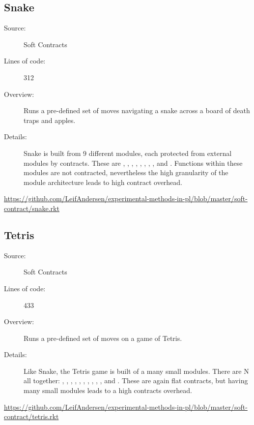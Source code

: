 \subsection*{Snake~\hrulefill}
\begin{description}
\item[Source:] Soft Contracts
\item[Lines of code:] 312
\item[Overview:]
  Runs a pre-defined set of moves navigating a snake across a board of death traps and apples.
\item[Details:] 
  Snake is built from 9 different modules, each protected from external modules by contracts.
  These are , , , , , , , , and .
  Functions within these modules are not contracted, nevertheless the high granularity of the module architecture leads to high contract overhead.
\end{description}
\url{https://github.com/LeifAndersen/experimental-methods-in-pl/blob/master/soft-contract/snake.rkt}

\subsection*{Tetris~\hrulefill}
\begin{description}
\item[Source:] Soft Contracts
\item[Lines of code:] 433
\item[Overview:]
  Runs a pre-defined set of moves on a game of Tetris.
\item[Details:] 
  Like Snake, the Tetris game is built of a many small modules.
  There are N all together: , , , , , , , , , , and .
  These are again flat contracts, but having many small modules leads to a high contracts overhead.
\end{description}
\url{https://github.com/LeifAndersen/experimental-methods-in-pl/blob/master/soft-contract/tetris.rkt}

